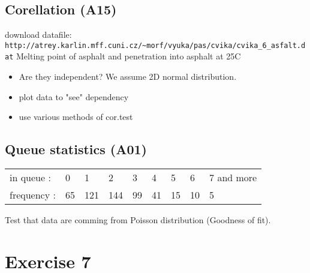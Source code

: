 \documentclass[4pt]{article}
\begin{document}
\subsection{Corellation (A15)}
download datafile: \verb'http://atrey.karlin.mff.cuni.cz/~morf/vyuka/pas/cvika/cvika_6_asfalt.dat'
Melting point of asphalt and penetration into asphalt at 25\textdegree C

\begin{itemize}
 \item Are they independent? We assume 2D normal distribution.

 \item plot data to "see" dependency
 \item use various methods of cor.test
\end{itemize}


\subsection{Queue statistics (A01)}

\begin{tabular}{lllllllll}
in queue        : &0  &1   &2   &3  &4  &5  &6  &7 and more\\
frequency       : &65 &121 &144 &99 &41 &15 &10 &5
\end{tabular}
Test that data are comming from Poisson distribution (Goodness of fit).





\noindent
\pagebreak


\section{Exercise 7}
\end{document}
